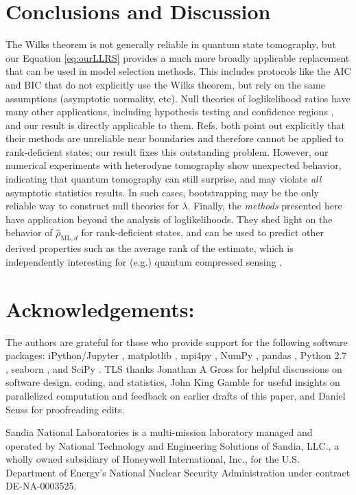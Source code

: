 \documentclass[aps,pra, twocolumn]{revtex4-1}
\newcommand{\rhohat}{\hat{\rho}}
\newcommand{\rhoML}[1]{\rhohat_{\scriptscriptstyle{\mathrm{ML},#1}}}
\begin{document}
\section{Conclusions and Discussion}
The Wilks theorem is not generally reliable in quantum state tomography, but our Equation \eqref{eq:ourLLRS} provides a much more broadly applicable replacement that can be used in model selection methods.  This includes protocols like the AIC and BIC \cite{Akaike1974, Schwarz1978, Kass1995, Burnham2004} that do not explicitly use the Wilks theorem, but rely on the same assumptions (asymptotic normality, etc).  Null theories of loglikelihood ratios have many other applications, including hypothesis testing \cite{Blume-Kohout2010,Moroder2013} and confidence regions \cite{Glancy2012a}, and our result is directly applicable to them.  Refs. \cite{Moroder2013,Glancy2012a} both point out explicitly that their methods are unreliable near boundaries and therefore cannot be applied to rank-deficient states; our result fixes this outstanding problem.  However, our numerical experiments with heterodyne tomography show unexpected behavior, indicating that quantum tomography can still surprise, and may violate \emph{all} asymptotic statistics results.  In such cases, bootstrapping \cite{Efron1979, Higgins2004} may be the only reliable way to construct null theories for $\lambda$.  Finally, the \emph{methods} presented here have application beyond the analysis of loglikelihoods.  They shed light on the behavior of $\rhoML{d}$ for rank-deficient states, and can be used to predict other derived properties such as the average rank of the estimate, which is independently interesting for (e.g.) quantum compressed sensing \cite{Flammia2012a, Steffens2016, Kalev2015, Kalev2015a}.

\section{Acknowledgements:} The authors are grateful for those who provide support for the following software packages: iPython/Jupyter \cite{Perez}, matplotlib
\cite{Hunter2007}, mpi4py \cite{Dalcin2011},  NumPy \cite{VanDerWalt2011}, pandas \cite{mckinney2010}, Python 2.7 
\cite{vanRossum}, seaborn \cite{Waskom2016}, and SciPy \cite{Oliphant2007a}. TLS thanks Jonathan A Gross for helpful 
discussions on software design, coding, and statistics, John King Gamble for useful insights on parallelized 
computation and feedback on earlier drafts of this paper, and Daniel Seuss for proofreading edits.

Sandia National Laboratories is a multi-mission laboratory managed and operated by National Technology and Engineering Solutions of Sandia, LLC., a wholly owned subsidiary of Honeywell International, Inc., for the U.S. Department of Energy's National Nuclear Security Administration under contract DE-NA-0003525.



\end{document}
